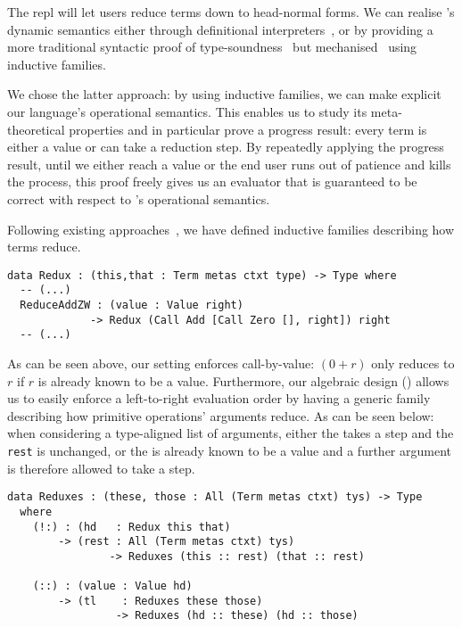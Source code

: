 The \Velo{} \acs*{repl} will let users reduce terms down to head-normal forms.
%
We can realise \Velo{}'s dynamic semantics either through definitional
interpreters~\cite{10.1145/3093333.3009866,Augustsson1999edt},
or by providing a more traditional syntactic proof of
type-soundness~\cite{DBLP:journals/iandc/WrightF94}
but mechanised~\cite[Part 2: Properties]{plfa22.08} using inductive families.

We chose the latter approach: by using inductive families, we can make explicit
our language's operational semantics.
%
This enables us to study its meta-theoretical properties and in particular prove
a progress result: every term is either a value or can take a reduction step.
%
By repeatedly applying the progress result, until we either reach a value or the end
user runs out of patience and kills the process, this proof freely gives us an
evaluator that is guaranteed to be correct with respect to \Velo{}'s operational
semantics.

Following existing approaches~\cite[Part 2: Properties]{plfa22.08}, we have defined
inductive families describing how terms reduce.

\begin{Verbatim}
data Redux : (this,that : Term metas ctxt type) -> Type where
  -- (...)
  ReduceAddZW : (value : Value right)
             -> Redux (Call Add [Call Zero [], right]) right
  -- (...)
\end{Verbatim}

As can be seen above, our setting enforces call-by-value: $(0 + r)$
only reduces to $r$ if $r$ is already known to be a value.
%
Furthermore, our algebraic design () allows
us to easily enforce a left-to-right evaluation order by having a generic
family describing how primitive operations' arguments reduce.
%
As can be seen below: when considering a type-aligned list of arguments,
either the  takes a step and the \texttt{rest} is unchanged,
or the  is already known to be a value and a further argument
is therefore allowed to take a step.

\begin{Verbatim}
data Reduxes : (these, those : All (Term metas ctxt) tys) -> Type
  where
    (!:) : (hd   : Redux this that)
        -> (rest : All (Term metas ctxt) tys)
                -> Reduxes (this :: rest) (that :: rest)

    (::) : (value : Value hd)
        -> (tl    : Reduxes these those)
                 -> Reduxes (hd :: these) (hd :: those)
\end{Verbatim}


